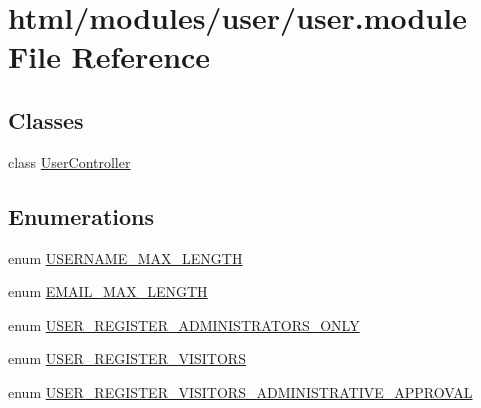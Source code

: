 \hypertarget{user_8module}{
\section{html/modules/user/user.module File Reference}
\label{user_8module}
}
\subsection*{Classes}
\begin{DoxyCompactItemize}
\item 
class \hyperlink{classUserController}{UserController}
\end{DoxyCompactItemize}
\subsection*{Enumerations}
\begin{DoxyCompactItemize}
\item 
enum \hyperlink{user_8module_ab5066e0a1cb5ba39be9389bdb7341e9c}{USERNAME\_\-MAX\_\-LENGTH} 
\item 
enum \hyperlink{user_8module_ace0e892f6bacb71d3660bc875ce80a96}{EMAIL\_\-MAX\_\-LENGTH} 
\item 
enum \hyperlink{user_8module_a86e7d065e288fde0300970e27f3f9438}{USER\_\-REGISTER\_\-ADMINISTRATORS\_\-ONLY} 
\item 
enum \hyperlink{user_8module_aad1e83ffc252c482267461bde962d19f}{USER\_\-REGISTER\_\-VISITORS} 
\item 
enum \hyperlink{user_8module_a46063390f086e98c8db7e380c0fa1fd5}{USER\_\-REGISTER\_\-VISITORS\_\-ADMINISTRATIVE\_\-APPROVAL} 
\end{DoxyCompactItemize}
